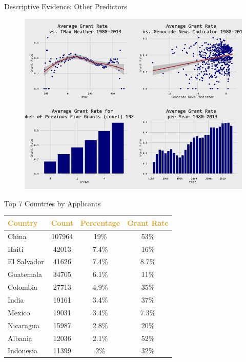 \begin{frame}{Descriptive Evidence: Other Predictors}

    \begin{figure}\label{fig:static_outside}
    \centering
    \includegraphics[height = 0.7 \textheight]{images/Static_Weather_News_Trend.png}
    \end{figure}
    
\end{frame}

\begin{frame}{Top 7 Countries by Applicants}
    \begin{table}[h!]
        \small
        \begin{center}
          \begin{tabular}{lccc}
            
            \textcolor{goldenrod}{\textbf{Country}} & \textcolor{goldenrod}{\textbf{Count}} & \textcolor{goldenrod}{\textbf{Percentage}} & \textcolor{goldenrod}{\textbf{Grant Rate}}  \\
            \hline
            China & 107964 & 19\% & 53\% \\
            Haiti & 42013 & 7.4\% & 16\% \\
            El Salvador & 41626 & 7.4\% & 8.7\%\\
            Guatemala & 34705 & 6.1\% & 11\% \\
            Colombia & 27713 & 4.9\% & 35\% \\
            India & 19161 & 3.4\% & 37\% \\
            Mexico & 19031& 3.4\% & 7.3\% \\
            Nicaragua & 15987 & 2.8\% & 20\%\\
            Albania & 12036 & 2.1\% & 52\% \\
            Indonesia & 11399 & 2\% & 32\%
          \end{tabular}
        \end{center}
      \end{table}
\end{frame}


